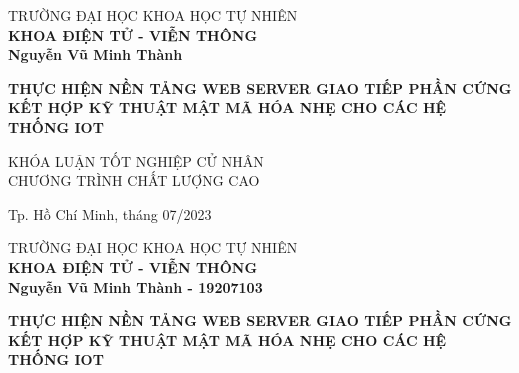 \begin{titlepage}

\begin{center}
TRƯỜNG ĐẠI HỌC KHOA HỌC TỰ NHIÊN\\
\textbf{KHOA ĐIỆN TỬ - VIỄN THÔNG}\\[2cm]


{ \Large \bfseries Nguyễn Vũ Minh Thành\\[2cm] } 


{ \Large \bfseries THỰC HIỆN NỀN TẢNG WEB SERVER GIAO TIẾP PHẦN CỨNG KẾT HỢP KỸ THUẬT MẬT MÃ HÓA NHẸ CHO CÁC HỆ THỐNG IOT \\[3cm]} 


\large KHÓA LUẬN TỐT NGHIỆP CỬ NHÂN\\
\large CHƯƠNG TRÌNH CHẤT LƯỢNG CAO\\



\vfill
Tp. Hồ Chí Minh, tháng 07/2023

\end{center}

\pagebreak



\begin{center}

TRƯỜNG ĐẠI HỌC KHOA HỌC TỰ NHIÊN\\
\textbf{KHOA ĐIỆN TỬ - VIỄN THÔNG}\\[2cm]


{\large \bfseries Nguyễn Vũ Minh Thành - 19207103\\[2cm]}


{ \Large \bfseries THỰC HIỆN NỀN TẢNG WEB SERVER GIAO TIẾP PHẦN CỨNG KẾT HỢP KỸ THUẬT MẬT MÃ HÓA NHẸ CHO CÁC HỆ THỐNG IOT\\[2cm] } 



\end{center}
\end{titlepage}
